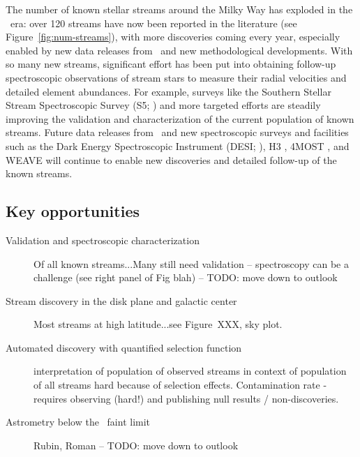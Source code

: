 \documentclass[final,5p,times,twocolumn,authoryear]{elsarticle}
\begin{document}
The number of known stellar streams around the Milky Way has exploded in the \gaia\ era:
over 120 streams have now been reported in the literature (see
Figure~\ref{fig:num-streams}), with more discoveries coming every year, especially
enabled by new data releases from \gaia\ and new methodological developments.
With so many new streams, significant effort has been put into obtaining follow-up
spectroscopic observations of stream stars to measure their radial velocities and
detailed element abundances.
For example, surveys like the Southern Stellar Stream Spectroscopic Survey (S5;
\citep{li:2019,li:2022}) and more targeted efforts \citep[e.g.,][]{ibata:2021} are
steadily improving the validation and characterization of the current population of
known streams.
Future data releases from \gaia\ and new spectroscopic surveys and facilities such as
the Dark Energy Spectroscopic Instrument (DESI; \citealt{desi:2016}), H3
\citep{conroy:2019}, 4MOST \citep{4most:2012}, and WEAVE \citep{weave:2012} will
continue to enable new discoveries and detailed follow-up of the known streams.



\subsection{Key opportunities}
\begin{description}
    \item[Validation and spectroscopic characterization] Of all known streams...Many still need validation -- spectroscopy can be a challenge (see right panel of Fig blah) -- TODO: move down to outlook
    \item[Stream discovery in the disk plane and galactic center] Most streams at high latitude...see Figure~XXX, sky plot.
    \item[Automated discovery with quantified selection function] interpretation of population of observed streams in context of population of all streams hard because of selection effects. Contamination rate - requires observing (hard!) and publishing null results / non-discoveries.
    \item[Astrometry below the \gaia\ faint limit] Rubin, Roman -- TODO: move down to outlook
\end{description}
\end{document}
